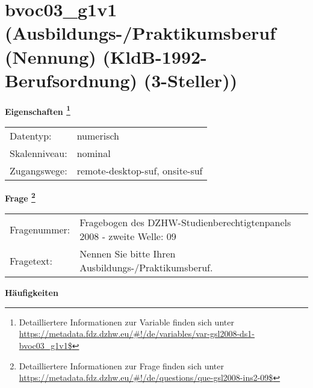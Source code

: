 
    \setcounter{footnote}{0}

    \vspace*{-1.8cm}
	\section{bvoc03\_g1v1 (Ausbildungs-/Praktikumsberuf (Nennung) (KldB-1992-Berufsordnung) (3-Steller))}
	\label{section:bvoc03_g1v1}



    \vspace*{0.5cm}
    \noindent\textbf{Eigenschaften
	\footnote{Detailliertere Informationen zur Variable finden sich unter
		\url{https://metadata.fdz.dzhw.eu/\#!/de/variables/var-gsl2008-ds1-bvoc03_g1v1$}}}\\
	\begin{tabularx}{\hsize}{@{}lX}
	Datentyp: & numerisch \\
	Skalenniveau: & nominal \\
	Zugangswege: &
	  remote-desktop-suf, 
	  onsite-suf
 \\
    \end{tabularx}



				\vspace*{0.5cm}
                \noindent\textbf{Frage
	                \footnote{Detailliertere Informationen zur Frage finden sich unter
		              \url{https://metadata.fdz.dzhw.eu/\#!/de/questions/que-gsl2008-ins2-09$}}}\\
				\begin{tabularx}{\hsize}{@{}lX}
					Fragenummer: &
					  Fragebogen des DZHW-Studienberechtigtenpanels 2008 - zweite Welle:
					  09
 \\
					Fragetext: & Nennen Sie bitte Ihren Ausbildungs-/Praktikumsberuf. \\
				\end{tabularx}





        		\vspace*{0.5cm}
                \noindent\textbf{Häufigkeiten}

